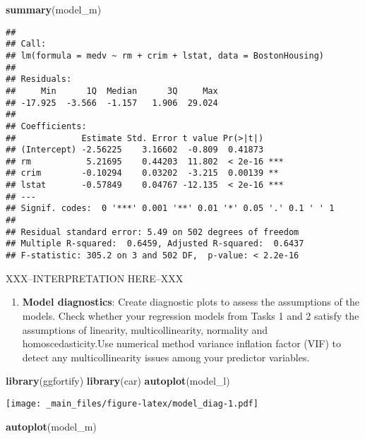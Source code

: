 \documentclass[
]{book}
\newenvironment{Shaded}{\begin{snugshade}}{\end{snugshade}}
\newcommand{\FunctionTok}[1]{\textcolor[rgb]{0.13,0.29,0.53}{\textbf{#1}}}
\newcommand{\NormalTok}[1]{#1}
\providecommand{\tightlist}{%
  \setlength{\itemsep}{0pt}\setlength{\parskip}{0pt}}
\begin{document}
\begin{Shaded}
\begin{Highlighting}[]
\FunctionTok{summary}\NormalTok{(model\_m)}
\end{Highlighting}
\end{Shaded}

\begin{verbatim}
## 
## Call:
## lm(formula = medv ~ rm + crim + lstat, data = BostonHousing)
## 
## Residuals:
##     Min      1Q  Median      3Q     Max 
## -17.925  -3.566  -1.157   1.906  29.024 
## 
## Coefficients:
##             Estimate Std. Error t value Pr(>|t|)    
## (Intercept) -2.56225    3.16602  -0.809  0.41873    
## rm           5.21695    0.44203  11.802  < 2e-16 ***
## crim        -0.10294    0.03202  -3.215  0.00139 ** 
## lstat       -0.57849    0.04767 -12.135  < 2e-16 ***
## ---
## Signif. codes:  0 '***' 0.001 '**' 0.01 '*' 0.05 '.' 0.1 ' ' 1
## 
## Residual standard error: 5.49 on 502 degrees of freedom
## Multiple R-squared:  0.6459, Adjusted R-squared:  0.6437 
## F-statistic: 305.2 on 3 and 502 DF,  p-value: < 2.2e-16
\end{verbatim}

XXX--INTERPRETATION HERE--XXX

\begin{enumerate}
\def\labelenumi{\arabic{enumi}.}
\setcounter{enumi}{3}
\tightlist
\item
  \textbf{Model diagnostics}: Create diagnostic plots to assess the assumptions of the models. Check whether your regression models from Tasks 1 and 2 satisfy the assumptions of linearity, multicollinearity, normality and homoscedasticity.Use numerical method variance inflation factor (VIF) to detect any multicollinearity issues among your predictor variables.
\end{enumerate}

\begin{Shaded}
\begin{Highlighting}[]
\FunctionTok{library}\NormalTok{(ggfortify)}
\FunctionTok{library}\NormalTok{(car)}
\FunctionTok{autoplot}\NormalTok{(model\_l)}
\end{Highlighting}
\end{Shaded}

\texttt{[image: \_main\_files/figure-latex/model\_diag-1.pdf]}

\begin{Shaded}
\begin{Highlighting}[]
\FunctionTok{autoplot}\NormalTok{(model\_m)}
\end{Highlighting}
\end{Shaded}
\end{document}
